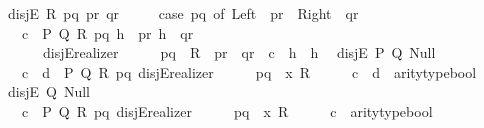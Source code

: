 \begin{isabellebody}
\isanewline
\ \ disjE\ {\isacharparenleft}{\kern0pt}R{\isacharparenright}{\kern0pt}{\isacharcolon}{\kern0pt}\ {\isachardoublequoteopen}{\isasymlambda}pq\ pr\ qr{\isachardot}{\kern0pt}\isanewline
\ \ \ \ \ {\isacharparenleft}{\kern0pt}case\ pq\ of\ Left\ {\isasymRightarrow}\ pr\ {\isacharbar}{\kern0pt}\ Right\ {\isasymRightarrow}\ qr{\isacharparenright}{\kern0pt}{\isachardoublequoteclose}\isanewline
\ \ \ \ {\isachardoublequoteopen}\isactrlbold {\isasymlambda}{\isacharparenleft}{\kern0pt}c{\isacharcolon}{\kern0pt}\ {\isacharunderscore}{\kern0pt}{\isacharparenright}{\kern0pt}\ P\ Q\ R\ pq\ {\isacharparenleft}{\kern0pt}h{}{\isacharcolon}{\kern0pt}\ {\isacharunderscore}{\kern0pt}{\isacharparenright}{\kern0pt}\ pr\ {\isacharparenleft}{\kern0pt}h{}{\isacharcolon}{\kern0pt}\ {\isacharunderscore}{\kern0pt}{\isacharparenright}{\kern0pt}\ qr{\isachardot}{\kern0pt}\isanewline
\ \ \ \ \ \ \ disjE{\isacharunderscore}{\kern0pt}realizer{}\ {\isasymcdot}\ {\isacharunderscore}{\kern0pt}\ {\isasymcdot}\ {\isacharunderscore}{\kern0pt}\ {\isasymcdot}\ pq\ {\isasymcdot}\ R\ {\isasymcdot}\ pr\ {\isasymcdot}\ qr\ {\isasymbullet}\ c\ {\isasymbullet}\ h{}\ {\isasymbullet}\ h{}{\isachardoublequoteclose}\isanewline
\isanewline
\ \ disjE\ {\isacharparenleft}{\kern0pt}P{\isacharcomma}{\kern0pt}\ Q{\isacharparenright}{\kern0pt}{\isacharcolon}{\kern0pt}\ {\isachardoublequoteopen}Null{\isachardoublequoteclose}\isanewline
\ \ \ \ {\isachardoublequoteopen}\isactrlbold {\isasymlambda}{\isacharparenleft}{\kern0pt}c{\isacharcolon}{\kern0pt}\ {\isacharunderscore}{\kern0pt}{\isacharparenright}{\kern0pt}\ {\isacharparenleft}{\kern0pt}d{\isacharcolon}{\kern0pt}\ {\isacharunderscore}{\kern0pt}{\isacharparenright}{\kern0pt}\ P\ Q\ R\ pq{\isachardot}{\kern0pt}\ disjE{\isacharunderscore}{\kern0pt}realizer\ {\isasymcdot}\ {\isacharunderscore}{\kern0pt}\ {\isasymcdot}\ {\isacharunderscore}{\kern0pt}\ {\isasymcdot}\ pq\ {\isasymcdot}\ {\isacharparenleft}{\kern0pt}{\isasymlambda}x{\isachardot}{\kern0pt}\ R{\isacharparenright}{\kern0pt}\ {\isasymcdot}\ {\isacharunderscore}{\kern0pt}\ {\isasymcdot}\ {\isacharunderscore}{\kern0pt}\ {\isasymbullet}\ c\ {\isasymbullet}\ d\ {\isasymbullet}\ arity{\isacharunderscore}{\kern0pt}type{\isacharunderscore}{\kern0pt}bool{\isachardoublequoteclose}\isanewline
\isanewline
\ \ disjE\ {\isacharparenleft}{\kern0pt}Q{\isacharparenright}{\kern0pt}{\isacharcolon}{\kern0pt}\ {\isachardoublequoteopen}Null{\isachardoublequoteclose}\isanewline
\ \ \ \ {\isachardoublequoteopen}\isactrlbold {\isasymlambda}{\isacharparenleft}{\kern0pt}c{\isacharcolon}{\kern0pt}\ {\isacharunderscore}{\kern0pt}{\isacharparenright}{\kern0pt}\ P\ Q\ R\ pq{\isachardot}{\kern0pt}\ disjE{\isacharunderscore}{\kern0pt}realizer{}\ {\isasymcdot}\ {\isacharunderscore}{\kern0pt}\ {\isasymcdot}\ {\isacharunderscore}{\kern0pt}\ {\isasymcdot}\ pq\ {\isasymcdot}\ {\isacharparenleft}{\kern0pt}{\isasymlambda}x{\isachardot}{\kern0pt}\ R{\isacharparenright}{\kern0pt}\ {\isasymcdot}\ {\isacharunderscore}{\kern0pt}\ {\isasymcdot}\ {\isacharunderscore}{\kern0pt}\ {\isasymbullet}\ c\ {\isasymbullet}\ arity{\isacharunderscore}{\kern0pt}type{\isacharunderscore}{\kern0pt}bool{\isachardoublequoteclose}\isanewline

\end{isabellebody}
